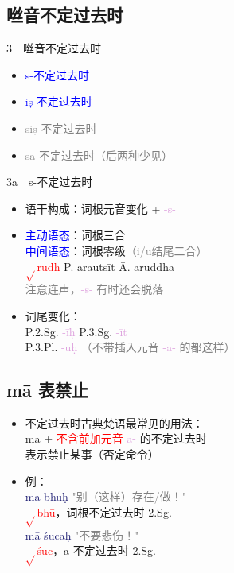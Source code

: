 \documentclass[17pt]{beamer}
\newcommand{\verbroot}[1]{\textcolor{red}{$\sqrt{}$#1}}
\newcommand{\fullpada}[1]{\textcolor{OliveGreen}{#1}}
\newcommand{\pratyaya}[1]{\mbox{\textcolor{Plum}{#1}}}
\newcommand{\fullsentence}[1]{\textcolor{MidnightBlue}{#1}}
\newcommand{\veryimportant}[1]{\textcolor{red}{#1}}
\newcommand{\important}[1]{\textcolor{blue}{#1}}
\newcommand{\notsoimportant}[1]{\textcolor{gray}{#1}}
\begin{document}
\subsection{咝音不定过去时}
\begin{frame}{3~~咝音不定过去时}
  \begin{itemize}
    \item[3a)] \important{s-不定过去时}~~
    \item[3b)] \important{iṣ-不定过去时}~~
    \item[3c)] \notsoimportant{siṣ-不定过去时}
    \item[3d)] \notsoimportant{sa-不定过去时（后两种少见）}
  \end{itemize}
\end{frame}

\begin{frame}{3a~~s-不定过去时}
  \small
  \begin{itemize}
    \item 语干构成：词根元音变化 + \pratyaya{-s-} 
    \item \important{主动语态}：词根三合\\
    \important{中间语态}：词根零级\notsoimportant{（i/u结尾二合）}\\
    \verbroot{rudh} P. \fullpada{arautsīt} Ā. \fullpada{aruddha} \\
    \notsoimportant{注意连声，\pratyaya{-s-} 有时还会脱落}
    \item 词尾变化：\\
    P.2.Sg. \pratyaya{-īḥ} P.3.Sg. \pratyaya{-īt} \\
    P.3.Pl. \pratyaya{-uḥ} \notsoimportant{（不带插入元音 \pratyaya{-a-} 的都这样）}
  \end{itemize}
\end{frame}



\subsection{mā 表禁止}

\begin{frame}{\insertsubsection}
  \small
  \begin{itemize}
    \item 不定过去时古典梵语最常见的用法：\\
    \fullpada{mā} + \veryimportant{不含前加元音 \pratyaya{a-} }的不定过去时\\
    表示禁止某事（否定命令）
    \item 例：\\
    \fullsentence{mā bhūḥ} \notsoimportant{"别（这样）存在/做！"}\\
    \verbroot{bhū}，词根不定过去时 2.Sg.    \\
    \fullsentence{mā śucaḥ} \notsoimportant{"不要悲伤！"}\\
    \verbroot{śuc}，a-不定过去时 2.Sg.
    
  \end{itemize}
\end{frame}
\end{document}
